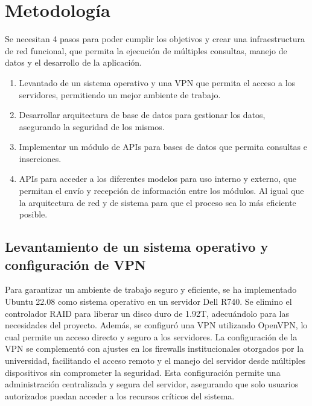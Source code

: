 \chapter{Metodología}

Se necesitan 4 pasos para poder cumplir los objetivos y crear una infraestructura de red funcional, que permita la ejecución de múltiples consultas, manejo de datos y el desarrollo de la aplicación.

\begin{enumerate}
    \item Levantado de un sistema operativo y una VPN que permita el acceso a los servidores, permitiendo un mejor ambiente de trabajo.
    \item Desarrollar arquitectura de base de datos para gestionar los datos, asegurando la seguridad de los mismos.
    \item Implementar un módulo de APIs para bases de datos que permita consultas e inserciones.
    \item APIs para acceder a los diferentes modelos para uso interno y externo, que permitan el envío y recepción de información entre los módulos. Al igual que la arquitectura de red y de sistema para que el proceso sea lo más eficiente posible.
\end{enumerate}

\section{Levantamiento de un sistema operativo y configuración de VPN}

Para garantizar un ambiente de trabajo seguro y eficiente, se ha implementado Ubuntu 22.08 como sistema operativo en un servidor Dell R740. Se elimino el controlador RAID para liberar un disco duro de 1.92T, adecuándolo para las necesidades del proyecto. Además, se configuró una VPN utilizando OpenVPN, lo cual permite un acceso directo y seguro a los servidores. La configuración de la VPN se complementó con ajustes en los firewalls institucionales otorgados por la universidad, facilitando el acceso remoto y el manejo del servidor desde múltiples dispositivos sin comprometer la seguridad. Esta configuración permite una administración centralizada y segura del servidor, asegurando que solo usuarios autorizados puedan acceder a los recursos críticos del sistema.

